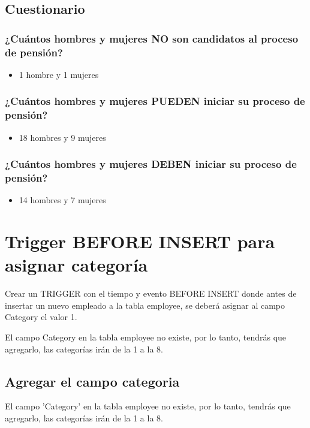 \documentclass[11pt]{article}
\begin{document}
\subsection{Cuestionario}
\label{sec:orgc88288b}
\subsubsection*{¿Cuántos hombres y mujeres NO son candidatos al proceso de pensión?}
\label{sec:orge16c82e}
\begin{itemize}
\item 1 hombre  y 1 mujeres
\end{itemize}

\subsubsection*{¿Cuántos hombres y mujeres PUEDEN iniciar su proceso de pensión?}
\label{sec:org12df5d4}
\begin{itemize}
\item 18 hombres y 9 mujeres
\end{itemize}

\subsubsection*{¿Cuántos hombres y mujeres DEBEN iniciar su proceso de pensión?}
\label{sec:org5f5d5ce}
\begin{itemize}
\item 14 hombres y 7 mujeres
\end{itemize}

\section{Trigger BEFORE INSERT para asignar categoría}
\label{sec:org84c3e48}
Crear un TRIGGER con el tiempo y evento BEFORE INSERT donde antes de insertar 
un nuevo empleado a la tabla employee, se deberá asignar al campo Category el 
valor 1. 

El campo Category en la tabla employee no existe, por lo tanto, tendrás que 
agregarlo, las categorías irán de la 1 a la 8.

\subsection{Agregar el campo categoria}
\label{sec:org2cb831e}
El campo 'Category' en la tabla employee no existe, por lo tanto, tendrás que
agregarlo, las categorías irán de la 1 a la 8.
\end{document}
